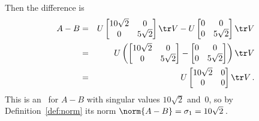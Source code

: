 \begin{example}
\begin{enumerate}
\begin{enumerate}
\begin{solution}
\begin{eqnarray*}
\end{eqnarray*}
Then the difference is
\begin{eqnarray*}
A-B&=&U\begin{bmatrix} 10\sqrt2&0\\0&5\sqrt2 \end{bmatrix}\tr V
-U\begin{bmatrix} 0&0\\0&5\sqrt2 \end{bmatrix}\tr V
\\&=&U\left(\begin{bmatrix} 10\sqrt2&0\\0&5\sqrt2 \end{bmatrix}
-\begin{bmatrix} 0&0\\0&5\sqrt2 \end{bmatrix}\right)\tr V
\\&=&U\begin{bmatrix} 10\sqrt2&0\\0&0 \end{bmatrix}\tr V\,.
\end{eqnarray*}
This is an \svd\ for \(A-B\) with singular values \(10\sqrt2\) and~\(0\), so by Definition~\ref{def:norm} its norm \(\norm{A-B}=\sigma_1=10\sqrt2\)\,.
\end{solution}


\end{enumerate}
\end{enumerate}
\end{example}
